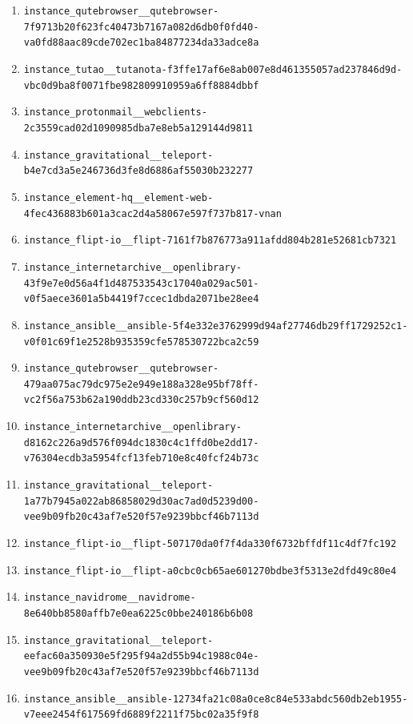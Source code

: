 \documentclass{llmxive}
\begin{document}
\sloppy
\setlength{\emergencystretch}{3em}
\setlength{\leftmargini}{1.8em}
\begin{enumerate}
\setlength{\itemsep}{0.15em}
\setlength{\parsep}{0pt}
\item \texttt{instance\_qutebrowser\_\_qutebrowser-7f9713b20f623fc40473b7167a082d6db0f0fd40-va0fd88aac89cde702ec1ba84877234da33adce8a}
\item \texttt{instance\_tutao\_\_tutanota-f3ffe17af6e8ab007e8d461355057ad237846d9d-vbc0d9ba8f0071fbe982809910959a6ff8884dbbf}
\item \texttt{instance\_protonmail\_\_webclients-2c3559cad02d1090985dba7e8eb5a129144d9811}
\item \texttt{instance\_gravitational\_\_teleport-b4e7cd3a5e246736d3fe8d6886af55030b232277}
\item \texttt{instance\_element-hq\_\_element-web-4fec436883b601a3cac2d4a58067e597f737b817-vnan}
\item \texttt{instance\_flipt-io\_\_flipt-7161f7b876773a911afdd804b281e52681cb7321}
\item \texttt{instance\_internetarchive\_\_openlibrary-43f9e7e0d56a4f1d487533543c17040a029ac501-v0f5aece3601a5b4419f7ccec1dbda2071be28ee4}
\item \texttt{instance\_ansible\_\_ansible-5f4e332e3762999d94af27746db29ff1729252c1-v0f01c69f1e2528b935359cfe578530722bca2c59}
\item \texttt{instance\_qutebrowser\_\_qutebrowser-479aa075ac79dc975e2e949e188a328e95bf78ff-vc2f56a753b62a190ddb23cd330c257b9cf560d12}
\item \texttt{instance\_internetarchive\_\_openlibrary-d8162c226a9d576f094dc1830c4c1ffd0be2dd17-v76304ecdb3a5954fcf13feb710e8c40fcf24b73c}
\item \texttt{instance\_gravitational\_\_teleport-1a77b7945a022ab86858029d30ac7ad0d5239d00-vee9b09fb20c43af7e520f57e9239bbcf46b7113d}
\item \texttt{instance\_flipt-io\_\_flipt-507170da0f7f4da330f6732bffdf11c4df7fc192}
\item \texttt{instance\_flipt-io\_\_flipt-a0cbc0cb65ae601270bdbe3f5313e2dfd49c80e4}
\item \texttt{instance\_navidrome\_\_navidrome-8e640bb8580affb7e0ea6225c0bbe240186b6b08}
\item \texttt{instance\_gravitational\_\_teleport-eefac60a350930e5f295f94a2d55b94c1988c04e-vee9b09fb20c43af7e520f57e9239bbcf46b7113d}
\item \texttt{instance\_ansible\_\_ansible-12734fa21c08a0ce8c84e533abdc560db2eb1955-v7eee2454f617569fd6889f2211f75bc02a35f9f8}

\end{enumerate}
\end{document}
